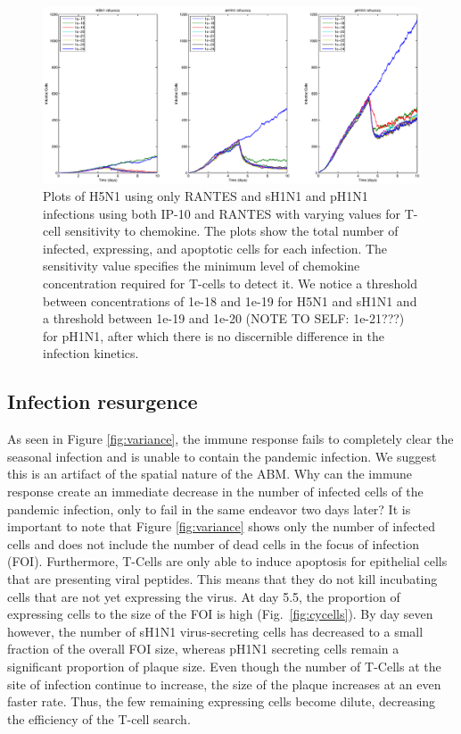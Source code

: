 \documentclass[10pt]{article}
\begin{document}
\begin{figure}[ht!]
\begin{center}
 \includegraphics[width=\textwidth]{sensitivity}
 \end{center}
\caption{Plots of H5N1 using only RANTES and sH1N1 and pH1N1 infections using both IP-10 and RANTES with varying values for T-cell sensitivity to chemokine.  The plots show the total number of infected, expressing, and apoptotic cells for each infection.  The sensitivity value specifies the minimum level of chemokine concentration required for T-cells to detect it.  We notice a threshold between concentrations of 1e-18 and 1e-19 for H5N1 and sH1N1 and a threshold between 1e-19 and 1e-20 (NOTE TO SELF: 1e-21???) for pH1N1, after which there is no discernible difference in the infection kinetics.} 
 \label{fig:sensitivity}
\end{figure}

\subsection*{Infection resurgence}

As seen in Figure \ref{fig:variance}, the immune response fails to completely clear the seasonal infection and is unable to contain the pandemic infection.  We suggest this is an artifact of the spatial nature of the ABM.  Why can the immune response create an immediate decrease in the number of infected cells of the pandemic infection, only to fail in the same endeavor two days later?  It is important to note that Figure \ref{fig:variance} shows only the number of infected cells and does not include the number of dead cells in the focus of infection (FOI).  Furthermore, T-Cells are only able to induce apoptosis for epithelial cells that are presenting viral peptides.  This means that they do not kill incubating cells that are not yet expressing the virus.  At day 5.5, the proportion of expressing cells to the size of the FOI is high (Fig.~\ref{fig:cycells}).  By day seven however, the number of sH1N1 virus-secreting cells has decreased to a small fraction of the overall FOI size, whereas pH1N1 secreting cells remain a significant proportion of plaque size.  Even though the number of T-Cells at the site of infection continue to increase, the size of the plaque increases at an even faster rate.  Thus, the few remaining expressing cells become dilute, decreasing the efficiency of the T-cell search.  
\end{document}
